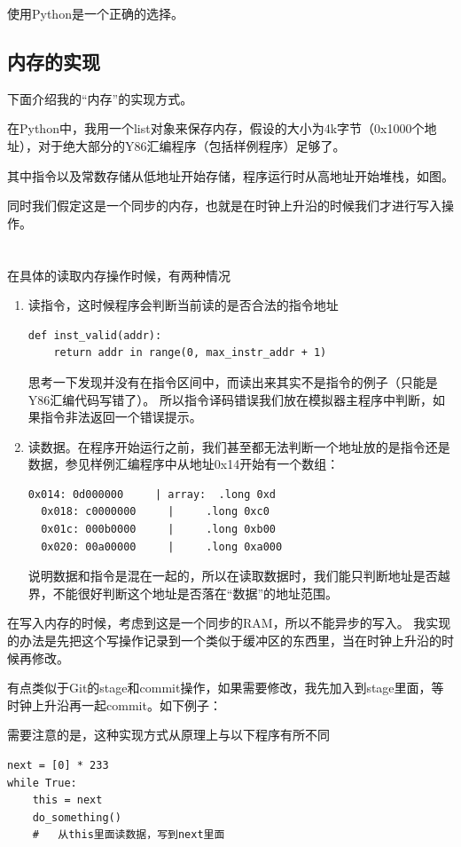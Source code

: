 \documentclass{article}
\begin{document}
使用Python是一个正确的选择。

\subsection{内存的实现}
下面介绍我的“内存”的实现方式。

在Python中，我用一个list对象来保存内存，假设的大小为4k字节（0x1000个地址），对于绝大部分的Y86汇编程序（包括样例程序）足够了。

其中指令以及常数存储从低地址开始存储，程序运行时从高地址开始堆栈，如图。

同时我们假定这是一个同步的内存，也就是在时钟上升沿的时候我们才进行写入操作。
\\
\\
\\
\indent 在具体的读取内存操作时候，有两种情况
\begin{enumerate}
\item 读指令，这时候程序会判断当前读的是否合法的指令地址
\begin{lstlisting}[frame=single]
def inst_valid(addr):
	return addr in range(0, max_instr_addr + 1)
\end{lstlisting}
思考一下发现并没有在指令区间中，而读出来其实不是指令的例子（只能是Y86汇编代码写错了）。
所以指令译码错误我们放在模拟器主程序中判断，如果指令非法返回一个错误提示。

\item 读数据。在程序开始运行之前，我们甚至都无法判断一个地址放的是指令还是数据，参见样例汇编程序中从地址0x14开始有一个数组：
\begin{lstlisting}[frame=single]
  0x014: 0d000000     | array:	.long 0xd
  0x018: c0000000     | 	.long 0xc0
  0x01c: 000b0000     | 	.long 0xb00
  0x020: 00a00000     | 	.long 0xa000
\end{lstlisting}

说明数据和指令是混在一起的，所以在读取数据时，我们能只判断地址是否越界，不能很好判断这个地址是否落在“数据”的地址范围。
\end{enumerate}


在写入内存的时候，考虑到这是一个同步的RAM，所以不能异步的写入。
我实现的办法是先把这个写操作记录到一个类似于缓冲区的东西里，当在时钟上升沿的时候再修改。

有点类似于Git的stage和commit操作，如果需要修改，我先加入到stage里面，等时钟上升沿再一起commit。如下例子：

需要注意的是，这种实现方式从原理上与以下程序有所不同
\begin{lstlisting}[frame=single]
next = [0] * 233
while True:
	this = next
	do_something()
	#	从this里面读数据，写到next里面
\end{lstlisting}
\end{document}

